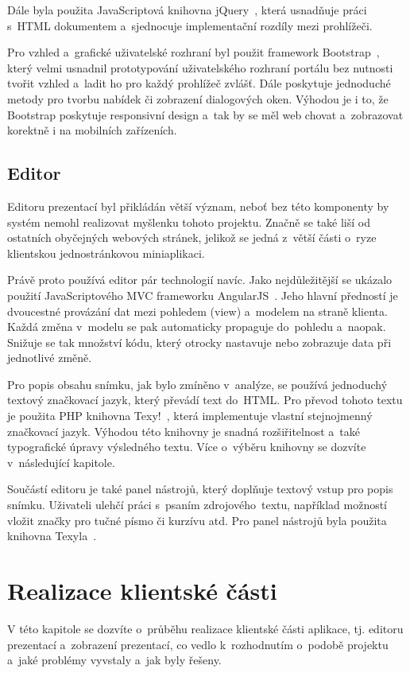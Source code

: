 \documentclass[11pt,twoside,a4paper]{book}
\newcommand*{\nom}[2]{#1\nomenclature{#1}{#2}} 			%
\begin{document}
Dále byla použita Java\-Scriptová knihovna jQuery~\cite{jQuery}, která usnadňuje práci s~HTML dokumentem a~sjednocuje imple\-mentační rozdíly mezi prohlížeči.

Pro vzhled a~grafické uživatelské rozhraní byl použit framework Bootstrap~\cite{bootstrap}, který velmi usnadnil prototypování uživatelského rozhraní portálu bez nutnosti tvořit vzhled a~ladit ho pro každý prohlížeč zvlášť. Dále poskytuje jednoduché metody pro tvorbu nabídek či zobrazení dialogových oken. Výhodou je i to, že Bootstrap poskytuje responsivní design a~tak by se měl web chovat a~zobrazovat korektně i na mobilních zařízeních.


\section{Editor}
Editoru prezentací byl přikládán větší význam, neboť bez této komponenty by systém nemohl realizovat myšlenku tohoto projektu. Značně se také liší od ostatních obyčejných webových stránek, jelikož se jedná z~větší části o~ryze klientskou jednostránkovou mini\-aplikaci.

Právě proto používá editor pár technologií navíc. Jako nejdůležitější se ukázalo použití Java\-Scriptového \nom{MVC}{Model-View-Controller} frameworku AngularJS~\cite{angular}. Jeho hlavní předností je dvoucestné provázání dat mezi pohledem (view) a~modelem na straně klienta. Každá změna v~modelu se pak automaticky propaguje do~pohledu a~naopak. Snižuje se tak množství kódu, který otrocky nastavuje nebo zobrazuje data při jednotlivé změně. 

Pro popis obsahu snímku, jak bylo zmíněno v~analýze, se používá jednoduchý textový značkovací jazyk, který převádí text do~HTML. Pro převod tohoto textu je použita PHP knihovna Texy!~\cite{texy}, která imple\-mentuje vlastní stejnojmenný značkovací jazyk. Výhodou této knihovny je snadná rozšiřitelnost a~také typografické úpravy výsledného textu. Více o~výběru knihovny se dozvíte v~následující kapitole.

Součástí editoru je také panel nástrojů, který doplňuje textový vstup pro popis snímku. Uživateli ulehčí práci s~psaním zdrojového~textu, například možností vložit značky pro tučné písmo či kurzívu atd. Pro panel nástrojů byla použita knihovna Texyla~\cite{texyla}.



\chapter{Realizace klientské části} \label{chap:realizace}
V této kapitole se dozvíte o~průběhu realizace klientské části aplikace, tj. editoru prezentací a~zobrazení prezentací, co vedlo k~rozhodnutím o~podobě projektu a~jaké problémy vyvstaly a~jak byly řešeny.
\end{document}
